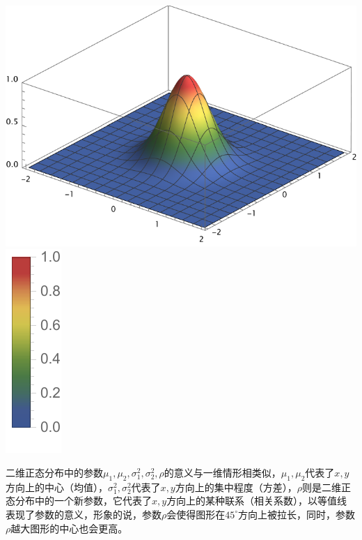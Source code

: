 \begin{Figure}[二维正态分布]
    \includegraphics[scale=0.75]{Mathematica/output/Gauss2D44.pdf}
    \hspace{0.2cm}
    \includegraphics[scale=1.0]{Mathematica/output/Gauss2DColorbar.pdf}
\end{Figure}
二维正态分布中的参数$\mu_1,\mu_2,\sigma_1^2,\sigma_2^2,\rho$的意义与一维情形相类似，$\mu_1,\mu_2$代表了$x,y$方向上的中心（均值），$\sigma_1^2,\sigma_2^2$代表了$x,y$方向上的集中程度（方差），$\rho$则是二维正态分布中的一个新参数，它代表了$x,y$方向上的某种联系（相关系数），以等值线表现了参数的意义，形象的说，参数$\rho$会使得图形在$45^{\circ}$方向上被拉长，同时，参数$\rho$越大图形的中心也会更高。

